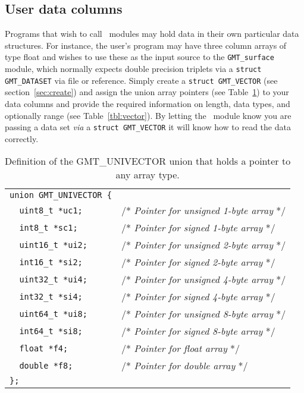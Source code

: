 \documentclass[11pt]{report}
\begin{document}
\subsection{User data columns}

Programs that wish to call \GMT\ modules may hold data in their own particular data
structures.  For instance, the user's program may have three column arrays of type float
and wishes to use these as the input source to the \texttt{GMT\_surface} module, which normally
expects double precision triplets via a \texttt{struct GMT\_DATASET} via file or reference.
Simply create a \texttt{struct GMT\_VECTOR} (see section~\ref{sec:create}) and assign the union
array pointers (see Table~\ref{tbl:univector}) to your data columns and provide
the required information on length, data types, and optionally range (see Table~\ref{tbl:vector}).
By letting the \GMT\ module know you are passing a data set \emph{via} a \texttt{struct GMT\_VECTOR} it
will know how to read the data correctly.

\begin{table}[h]
\small
\centering
\begin{tabular}{ll} \hline
\verb!union GMT_UNIVECTOR {! & \\
\verb!  uint8_t *uc1;!  & /* \emph{Pointer for unsigned 1-byte array} */ \\
\verb!  int8_t *sc1;!   & /* \emph{Pointer for signed 1-byte array} */ \\
\verb!  uint16_t *ui2;! & /* \emph{Pointer for unsigned 2-byte array} */ \\
\verb!  int16_t *si2;!  & /* \emph{Pointer for signed 2-byte array} */ \\
\verb!  uint32_t *ui4;! & /* \emph{Pointer for unsigned 4-byte array} */ \\
\verb!  int32_t *si4;!  & /* \emph{Pointer for signed 4-byte array} */ \\
\verb!  uint64_t *ui8;! & /* \emph{Pointer for unsigned 8-byte array} */ \\
\verb!  int64_t *si8;!  & /* \emph{Pointer for signed 8-byte array} */ \\
\verb!  float *f4;!     & /* \emph{Pointer for float array} */ \\
\verb!  double *f8;!    & /* \emph{Pointer for double array} */ \\
\verb!};!               & \\
\hline
\end{tabular}
\caption{Definition of the GMT\_UNIVECTOR union that holds a pointer to any array type.}
\label{tbl:univector}
\end{table}
\end{document}
